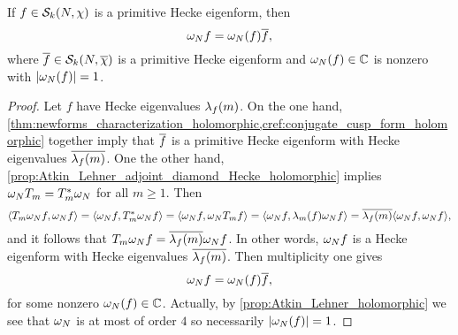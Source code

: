     \begin{proposition}\label{prop:Atkin_Lehner_conjugation_holomorphic}
      If $f \in \mathcal{S}_{k}(N,\chi)$ is a primitive Hecke eigenform, then
      \[
        \omega_{N}f = \omega_{N}(f)\overline{f},
      \]
      where $\overline{f} \in \mathcal{S}_{k}(N,\overline{\chi})$ is a primitive Hecke eigenform and $\omega_{N}(f) \in \mathbb{C}$ is nonzero with $|\omega_{N}(f)| = 1$.
    \end{proposition}
    \begin{proof}
      Let $f$ have Hecke eigenvalues $\lambda_{f}(m)$. On the one hand, \cref{thm:newforms_characterization_holomorphic,cref:conjugate_cusp_form_holomorphic} together imply that $\overline{f}$ is a primitive Hecke eigenform with Hecke eigenvalues $\overline{\lambda_{f}(m)}$. One the other hand, \cref{prop:Atkin_Lehner_adjoint_diamond_Hecke_holomorphic} implies $\omega_{N}T_{m} = T_{m}^{\ast}\omega_{N}$ for all $m \ge 1$. Then
      \[
        \langle T_{m}\omega_{N}f,\omega_{N}f\rangle = \langle\omega_{N}f,T_{m}^{\ast}\omega_{N}f\rangle = \langle\omega_{N}f,\omega_{N}T_{m}f\rangle = \langle\omega_{N}f,\lambda_{m}(f)\omega_{N}f\rangle = \overline{\lambda_{f}(m)}\langle\omega_{N}f,\omega_{N}f\rangle,
      \]
      and it follows that $T_{m}\omega_{N}f = \overline{\lambda_{f}(m)}\omega_{N}f$. In other words, $\omega_{N}f$ is a Hecke eigenform with Hecke eigenvalues $\overline{\lambda_{f}(m)}$. Then multiplicity one gives
      \[
        \omega_{N}f = \omega_{N}(f)\overline{f},
      \]
      for some nonzero $\omega_{N}(f) \in \mathbb{C}$. Actually, by \cref{prop:Atkin_Lehner_holomorphic} we see that $\omega_{N}$ is at most of order $4$ so necessarily $|\omega_{N}(f)| = 1$.
    \end{proof} 
